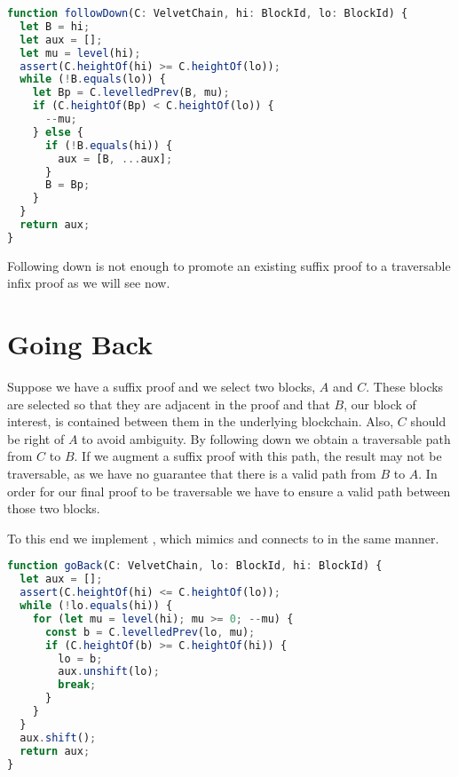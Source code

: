 
\begin{lstlisting}[language=Javascript]
function followDown(C: VelvetChain, hi: BlockId, lo: BlockId) {
  let B = hi;
  let aux = [];
  let mu = level(hi);
  assert(C.heightOf(hi) >= C.heightOf(lo));
  while (!B.equals(lo)) {
    let Bp = C.levelledPrev(B, mu);
    if (C.heightOf(Bp) < C.heightOf(lo)) {
      --mu;
    } else {
      if (!B.equals(hi)) {
        aux = [B, ...aux];
      }
      B = Bp;
    }
  }
  return aux;
}
\end{lstlisting}

Following down is not enough to promote an existing suffix proof to a traversable infix proof as we will see now.

\section{Going Back}

Suppose we have a suffix proof and we select two blocks, $A$ and $C$. These blocks are selected so that they are adjacent in the proof and that $B$, our block of interest, is contained between them in the underlying blockchain. Also, $C$ should be right of $A$ to avoid ambiguity. By following down we obtain a traversable path from $C$ to $B$. If we augment a suffix proof with this path, the result may not be traversable, as we have no guarantee that there is a valid path from $B$ to $A$. In order for our final proof to be traversable we have to ensure a valid path between those two blocks.

To this end we implement , which mimics  and connects  to  in the same manner.


\begin{lstlisting}[language=Javascript]
function goBack(C: VelvetChain, lo: BlockId, hi: BlockId) {
  let aux = [];
  assert(C.heightOf(hi) <= C.heightOf(lo));
  while (!lo.equals(hi)) {
    for (let mu = level(hi); mu >= 0; --mu) {
      const b = C.levelledPrev(lo, mu);
      if (C.heightOf(b) >= C.heightOf(hi)) {
        lo = b;
        aux.unshift(lo);
        break;
      }
    }
  }
  aux.shift();
  return aux;
}
\end{lstlisting}

